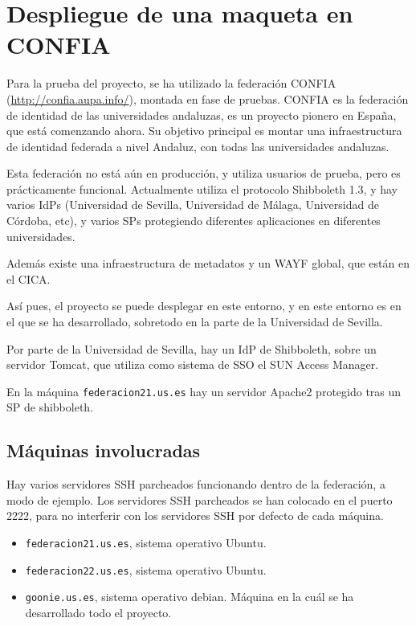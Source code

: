 \chapter{Despliegue de una maqueta en CONFIA}

    Para la prueba del proyecto, se ha utilizado la federación CONFIA
    (\url{http://confia.aupa.info/}),
    montada en fase de pruebas. CONFIA es la federación de identidad de las
    universidades andaluzas, es un proyecto pionero en España, que está
    comenzando ahora. Su objetivo principal es montar una infraestructura
    de identidad federada a nivel Andaluz, con todas las universidades
    andaluzas.

    Esta federación no está aún en producción, y utiliza usuarios de
    prueba, pero es prácticamente funcional. Actualmente utiliza el
    protocolo Shibboleth 1.3, y hay varios IdPs (Universidad de Sevilla,
    Universidad de Málaga, Universidad de Córdoba, etc), y varios SPs
    protegiendo diferentes aplicaciones en diferentes universidades.

    Además existe una infraestructura de metadatos y un WAYF global,
    que están en el CICA.

    Así pues, el proyecto se puede desplegar en este entorno, y en este
    entorno es en el que se ha desarrollado, sobretodo en la parte de la
    Universidad de Sevilla.

    Por parte de la Universidad de Sevilla, hay un IdP de Shibboleth, sobre
    un servidor Tomcat, que utiliza como sistema de SSO el SUN Access
    Manager.


    En la máquina \texttt{federacion21.us.es} hay un servidor Apache2
    protegido tras un SP de shibboleth.

\section{Máquinas involucradas}

    Hay varios servidores SSH parcheados funcionando dentro de la
    federación, a modo de ejemplo. Los servidores SSH parcheados se han
    colocado en el puerto 2222, para no interferir con los servidores SSH
    por defecto de cada máquina.

    \begin{itemize}

    \item \texttt{federacion21.us.es}, sistema operativo Ubuntu.
    \item \texttt{federacion22.us.es}, sistema operativo Ubuntu.
    \item \texttt{goonie.us.es}, sistema operativo debian. Máquina en la
    cuál se ha desarrollado todo el proyecto.

    \end{itemize}

